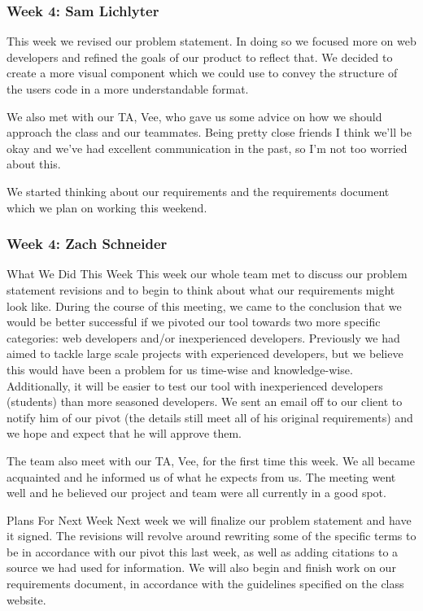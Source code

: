 \subsubsection{Week 4: Sam Lichlyter}

This week we revised our problem statement. In doing so we focused more on web developers and refined the goals of our product to reflect that. We decided to create a more visual component which we could use to convey the structure of the users code in a more understandable format. 

We also met with our TA, Vee, who gave us some advice on how we should approach the class and our teammates. Being pretty close friends I think we'll be okay and we've had excellent communication in the past, so I'm not too worried about this. 

We started thinking about our requirements and the requirements document which we plan on working this weekend. 

\subsubsection{Week 4: Zach Schneider}

What We Did This Week
This week our whole team met to discuss our problem statement revisions and to begin to think about what our requirements might look like. During the course of this meeting, we came to the conclusion that we would be better successful if we pivoted our tool towards two more specific categories: web developers and/or inexperienced developers. Previously we had aimed to tackle large scale projects with experienced developers, but we believe this would have been a problem for us time-wise and knowledge-wise. Additionally, it will be easier to test our tool with inexperienced developers (students) than more seasoned developers. We sent an email off to our client to notify him of our pivot (the details still meet all of his original requirements) and we hope and expect that he will approve them.

The team also meet with our TA, Vee, for the first time this week. We all became acquainted and he informed us of what he expects from us. The meeting went well and he believed our project and team were all currently in a good spot.

Plans For Next Week
Next week we will finalize our problem statement and have it signed. The revisions will revolve around rewriting some of the specific terms to be in accordance with our pivot this last week, as well as adding citations to a source we had used for information. We will also begin and finish work on our requirements document, in accordance with the guidelines specified on the class website.

